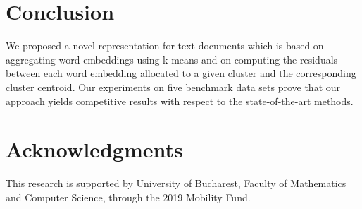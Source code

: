 \documentclass[11pt,a4paper]{article}
\begin{document}
\vspace*{-0.1cm}
\section{Conclusion}
\label{sec:C}
\vspace*{-0.1cm}

We proposed a novel representation for text documents which is based on aggregating word embeddings using k-means and on computing the residuals between each word embedding allocated to a given cluster and the corresponding cluster centroid. Our experiments on five benchmark data sets prove that our approach yields competitive results with respect to the state-of-the-art methods.

\vspace*{-0.1cm}
\section*{Acknowledgments}
\vspace*{-0.1cm}
This research is supported by University of Bucharest, Faculty of Mathematics and Computer Science, through the 2019 Mobility Fund.



\end{document}
